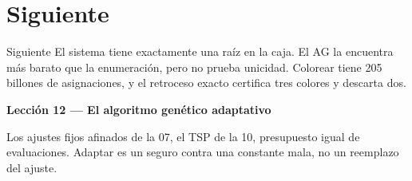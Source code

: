 \section{Siguiente}

\begin{frame}{Siguiente}
El sistema tiene exactamente una raíz en la caja. El AG la encuentra más barato que la enumeración, pero no prueba unicidad. Colorear tiene 205 billones de asignaciones, y el retroceso exacto certifica tres colores y descarta dos.

\vspace{0.8em}
\textbf{Lección 12 --- El algoritmo genético adaptativo}

Los ajustes fijos afinados de la 07, el TSP de la 10, presupuesto igual de evaluaciones. Adaptar es un seguro contra una constante mala, no un reemplazo del ajuste.
\end{frame}

